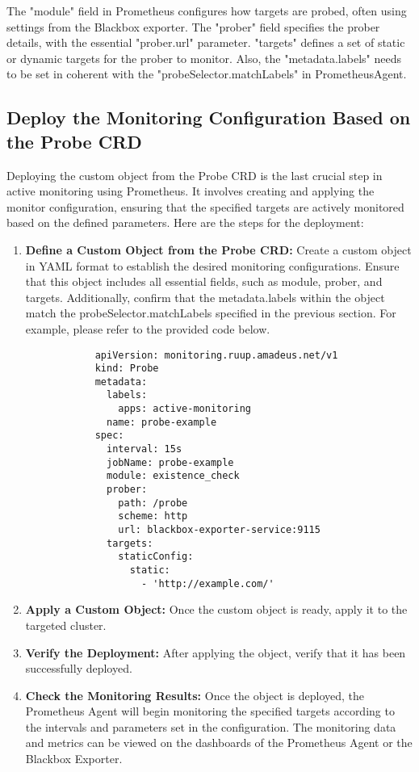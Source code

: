 The "module" field in Prometheus configures how targets are probed, often using settings from the Blackbox exporter. The "prober" field specifies the prober details, with the essential "prober.url" parameter. "targets" defines a set of static or dynamic targets for the prober to monitor. Also, the "metadata.labels" needs to be set in coherent with the "probeSelector.matchLabels" in PrometheusAgent. 

\subsection{Deploy the Monitoring Configuration Based on the Probe \ac{CRD}}

Deploying the custom object from the Probe \ac{CRD} is the last crucial step in active monitoring using Prometheus. It involves creating and applying the monitor configuration, ensuring that the specified targets are actively monitored based on the defined parameters. Here are the steps for the deployment:

\begin{enumerate}
    \item \textbf{Define a Custom Object from the Probe \ac{CRD}:}
    Create a custom object in YAML format to establish the desired monitoring configurations. Ensure that this object includes all essential fields, such as module, prober, and targets. Additionally, confirm that the metadata.labels within the object match the probeSelector.matchLabels specified in the previous section. For example, please refer to the provided code below. 
        \begin{lstlisting}
            apiVersion: monitoring.ruup.amadeus.net/v1
            kind: Probe
            metadata:
              labels:
                apps: active-monitoring
              name: probe-example
            spec:
              interval: 15s
              jobName: probe-example
              module: existence_check
              prober:
                path: /probe
                scheme: http
                url: blackbox-exporter-service:9115
              targets:
                staticConfig:
                  static:
                    - 'http://example.com/'
        \end{lstlisting}
    \item \textbf{Apply a Custom Object:}
    Once the custom object is ready, apply it to the targeted cluster. 
    \item \textbf{Verify the Deployment:}
    After applying the object, verify that it has been successfully deployed. 
    \item \textbf{Check the Monitoring Results:}
    Once the object is deployed, the Prometheus Agent will begin monitoring the specified targets according to the intervals and parameters set in the configuration. The monitoring data and metrics can be viewed on the dashboards of the Prometheus Agent or the Blackbox Exporter. 
\end{enumerate}

